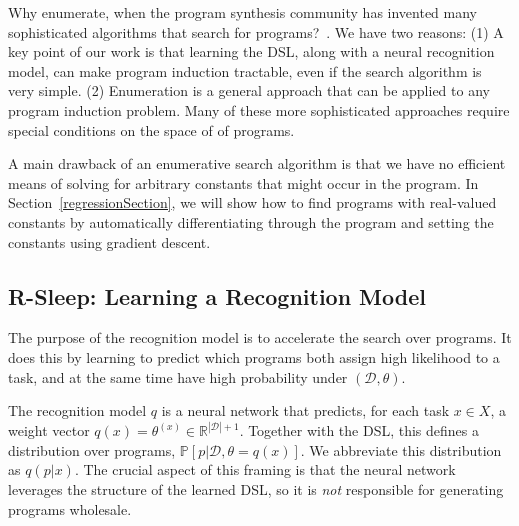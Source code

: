 \documentclass{article}
\newcommand{\probability}{\mathds{P}} %
\begin{document}
Why enumerate, when the program synthesis community has invented many
sophisticated algorithms that search for programs?~\cite{solar2008program,schkufza2013stochastic,feser2015synthesizing,osera2015type,polozov2015flashmeta}.
We have two reasons:
(1) A key point of our work is that learning the DSL, along with a neural recognition model, can make program induction tractable, even if the search algorithm is very simple.
(2) Enumeration is a general approach that can be applied to any program induction problem. Many of these more sophisticated approaches require special conditions on
  the space of of programs.

A main drawback of an enumerative search algorithm is that we have no
efficient means of solving for arbitrary constants that might occur in the
program. In Section~\ref{regressionSection},
we will show how to find programs with real-valued constants
by automatically differentiating through the program and setting the constants using gradient descent.







\subsection{R-Sleep: Learning a Recognition Model}\label{recognitionSection}

The purpose of the recognition model is to accelerate the search over
programs.  It does this by learning to predict which programs both 
assign high likelihood to a task, and at the same time 
have high probability under $(\mathcal{D},\theta)$.

The recognition model $q$ is a neural network that predicts,
for each task $x\in X$, a weight vector $q(x) = \theta^{(x)}\in \mathbb{R}^{|\mathcal{D}| + 1}$.
Together with the DSL, this defines a distribution over programs,
$\probability[p|\mathcal{D},\theta = q(x)]$.
We abbreviate this distribution as $q(p|x)$.
The crucial aspect of this framing is that the neural network
leverages the structure of the learned DSL,
so it is \emph{not} responsible for
generating programs wholesale.
\end{document}
